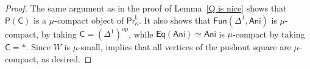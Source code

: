 \begin{proof}
The same argument as in the proof of Lemma~\ref{Q is nice} shows that $\mathsf{P}(\mathsf{C})$ is a $\mu$-compact object of $\mathsf{Pr}^\mathsf{L}_\kappa$. It also shows that $\mathsf{Fun}(\Delta^1,\mathsf{Ani})$ is $\mu$-compact, by taking $\mathsf{C}=(\Delta^1)^{\mathrm{op}}$, while $\mathsf{Eq}(\mathsf{Ani})\simeq\mathsf{Ani}$ is $\mu$-compact by taking $\mathsf{C}=\ast$. Since $W$ is $\mu$-small, \cite[Tag~\href{https://kerodon.net/tag/064X}{064X}]{kerodon} implies that all vertices of the pushout square are $\mu$-compact, as desired.
\end{proof}